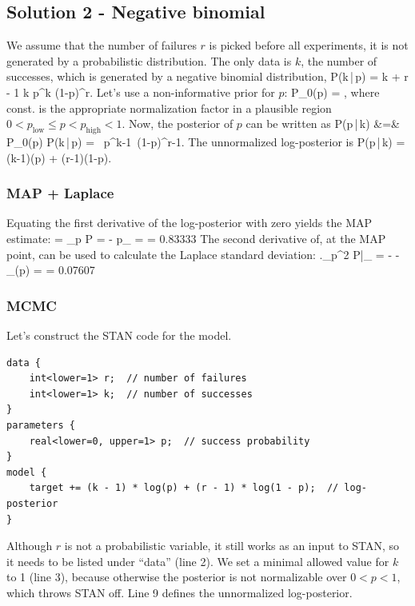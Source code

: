 \documentclass[10pt,oneside]{article}
\begin{document}
\newpage
\subsection*{Solution 2 - Negative binomial}
We assume that the number of failures $r$ is picked before all experiments, it is not generated by a probabilistic distribution. The only data is $k$, the number of successes, which is generated by a negative binomial distribution,
\be
	P(k\,|\,p) = {k + r - 1 \choose k} p^k (1-p)^r.
\ee
Let's use a non-informative prior for $p$:
\be
	P_0(p) = ,
\ee
where const. is the appropriate normalization factor in a plausible region $0 < p_\text{low} \leq p < p_\text{high} < 1$. Now, the posterior of $p$ can be written as 
\ba
	P(p\,|\,k) &=& \times P_0(p) \times P(k\,|\,p) = \, p^{k-1}\, (1-p)^{r-1}.
\ea
The unnormalized log-posterior is
\be
	\log \tilde P(p\,|\,k) = (k-1)\log(p) + (r-1)\log(1-p).	
\ee


\subsubsection*{MAP + Laplace}
Equating the first derivative of the log-posterior with zero yields the MAP estimate:
 = \partial_p \log\tilde P =  -  \qquad \Rightarrow \qquad p_ =  = 0.83333
\ee
The second derivative of, at the MAP point, can be used to calculate the Laplace standard deviation:
\be
	\left.\partial_p^2 \log\tilde P\right|_ = - - \qquad\Rightarrow \qquad {}_(p) =  = 0.07607
\ee

\subsubsection*{MCMC}
Let's construct the STAN code for the model.
\begin{lstlisting}[language={}]
data {
    int<lower=1> r;  // number of failures
    int<lower=1> k;  // number of successes
}
parameters {
    real<lower=0, upper=1> p;  // success probability
}
model {
    target += (k - 1) * log(p) + (r - 1) * log(1 - p);  // log-posterior
}
\end{lstlisting}

Although $r$ is not a probabilistic variable, it still works as an input to STAN, so it needs to be listed under ``data'' (line 2). We set a minimal allowed value for $k$ to 1 (line 3), because otherwise the posterior is not normalizable over $0<p<1$, which throws STAN off. Line 9 defines the unnormalized log-posterior.
\end{document}
